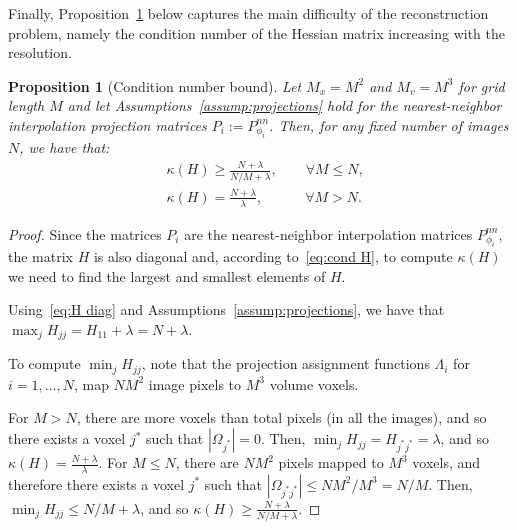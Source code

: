 \documentclass{article}
\newtheorem{proposition}[theorem]{Proposition}
\begin{document}
Finally, Proposition~\ref{prop:cond} below captures the main difficulty of the 
reconstruction problem, namely the condition number of the Hessian matrix 
increasing with the resolution.
\begin{proposition}[Condition number bound]\label{prop:cond}
    Let $M_x = M^2$ and $M_v = M^3 $ for grid length $M$ and let Assumptions~\ref{assump:projections} 
    hold for the nearest-neighbor interpolation projection matrices $P_i := P_{\phi_i}^{nn}$.
    Then, for any fixed number of images $N$, we have that:
    \begin{subequations}
    \begin{align}
        &\kappa(H) \geq \frac{N + \lambda}{N/M + \lambda},
        \qquad \forall M \leq N,
        \label{eq:cond number square lessthan}
        \\
        &\kappa(H) = \frac{N + \lambda}{\lambda},
        \quad\qquad \forall M > N.
    \end{align}
    \label{eq:cond number square}
    \end{subequations}
\end{proposition}
\begin{proof}
    Since the matrices $P_i$ are the nearest-neighbor interpolation matrices
    $P_{\phi_i}^{nn}$, the matrix $H$ is also diagonal and, according to~\eqref{eq:cond H},
    to compute $\kappa(H)$ we need to find the largest and smallest elements of $H$. 

    Using~\eqref{eq:H diag} and Assumptions~\ref{assump:projections}, we have that
    $\max_{j} H_{jj} = H_{11} + \lambda = N+\lambda$.

    To compute $\min_{j} H_{jj}$, note that the projection assignment functions
    $\Lambda_i$ for $i=1,\ldots,N$, map $NM^2$ image pixels to $M^3$ volume voxels.

    For $M > N$, there are more voxels than total pixels (in all the
    images), and so there exists a voxel $j^*$ such that $|\Omega_{j^*}| = 0$. 
    Then, $\min_{j}H_{jj} = H_{j^* j^*} = \lambda$, 
    and so $\kappa(H) = \frac{N+\lambda}{\lambda}$.
    For $M \leq N$, there are $NM^2$ pixels mapped to $M^3$ voxels, and therefore
    there exists a voxel $j^*$ such that $|\Omega_{j^*j^*}| \leq NM^2/M^3 = N/M$.
    Then, $\min_j H_{jj} \leq N/M + \lambda$, and so
    $\kappa(H) \geq \frac{N+\lambda}{N/M + \lambda}$.
\end{proof}
\end{document}
